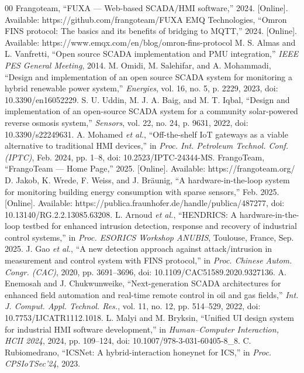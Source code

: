 \documentclass[conference]{IEEEtran}
\begin{document}
\begin{thebibliography}{00}
 Frangoteam, ``FUXA — Web-based SCADA/HMI software,'' 2024. [Online]. Available: https://github.com/frangoteam/FUXA
 EMQ Technologies, ``Omron FINS protocol: The basics and its benefits of bridging to MQTT,'' 2024. [Online]. Available: https://www.emqx.com/en/blog/omron-fins-protocol
 M. S. Almas and L. Vanfretti, ``Open source SCADA implementation and PMU integration,'' \textit{IEEE PES General Meeting}, 2014.
 M. Omidi, M. Salehifar, and A. Mohammadi, ``Design and implementation of an open source SCADA system for monitoring a hybrid renewable power system,'' \textit{Energies}, vol. 16, no. 5, p. 2229, 2023, doi: 10.3390/en16052229.
 S. U. Uddin, M. J. A. Baig, and M. T. Iqbal, ``Design and implementation of an open-source SCADA system for a community solar-powered reverse osmosis system,'' \textit{Sensors}, vol. 22, no. 24, p. 9631, 2022, doi: 10.3390/s22249631.
 A. Mohamed \textit{et al.}, ``Off-the-shelf IoT gateways as a viable alternative to traditional HMI devices,'' in \textit{Proc. Int. Petroleum Technol. Conf. (IPTC)}, Feb. 2024, pp. 1–8, doi: 10.2523/IPTC-24344-MS.
 FrangoTeam, ``FrangoTeam — Home Page,'' 2025. [Online]. Available: https://frangoteam.org/
 D. Jakob, K. Wrede, F. Weiss, and J. Bräunig, ``A hardware-in-the-loop system for monitoring building energy consumption with sparse sensors,'' Feb. 2025. [Online]. Available: https://publica.fraunhofer.de/handle/publica/487277, doi: 10.13140/RG.2.2.13085.63208.
 L. Arnoud \textit{et al.}, ``HENDRICS: A hardware-in-the-loop testbed for enhanced intrusion detection, response and recovery of industrial control systems,'' in \textit{Proc. ESORICS Workshop ANUBIS}, Toulouse, France, Sep. 2025.
 J. Gao \textit{et al.}, ``A new detection approach against attack/intrusion in measurement and control system with FINS protocol,'' in \textit{Proc. Chinese Autom. Congr. (CAC)}, 2020, pp. 3691–3696, doi: 10.1109/CAC51589.2020.9327136.
 A. Enemosah and J. Chukwunweike, ``Next-generation SCADA architectures for enhanced field automation and real-time remote control in oil and gas fields,'' \textit{Int. J. Comput. Appl. Technol. Res.}, vol. 11, no. 12, pp. 514–529, 2022, doi: 10.7753/IJCATR1112.1018.
 L. Malyi and M. Bryksin, ``Unified UI design system for industrial HMI software development,'' in \textit{Human–Computer Interaction, HCII 2024}, 2024, pp. 109–124, doi: 10.1007/978-3-031-60405-8\_8.
 C. Rubiomedrano, ``ICSNet: A hybrid-interaction honeynet for ICS,'' in \textit{Proc. CPSIoTSec’24}, 2023.

\end{thebibliography}
\end{document}
